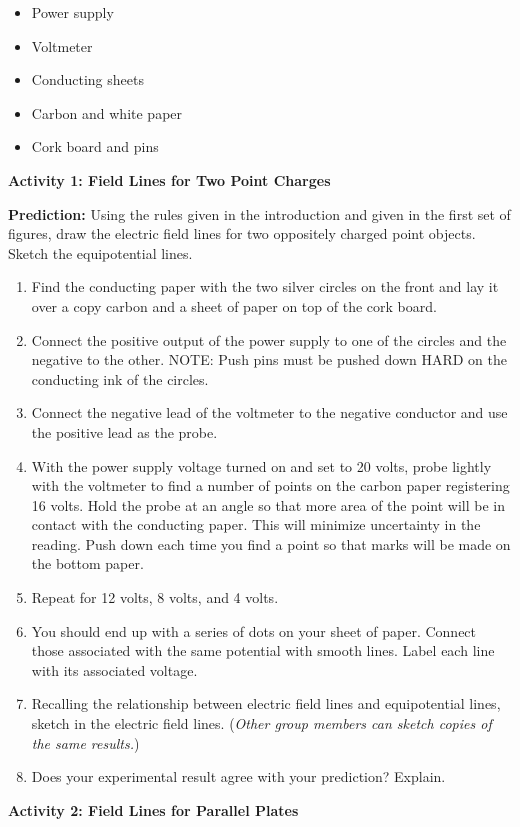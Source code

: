 \begin{itemize}
\item Power supply
\item Voltmeter
\item Conducting sheets
\item Carbon and white paper
\item Cork board and pins
\end{itemize}
\textbf{Activity 1: Field Lines for Two Point Charges}

\textbf{Prediction:} Using the rules given in the introduction and
given in the first set of figures, draw the electric field lines for two
oppositely charged point objects. Sketch the equipotential lines.
\vspace{1in}

\begin{enumerate}
\item Find the conducting paper with the two silver circles on the front
and lay it over a copy carbon and a sheet of paper on top of the cork
board.
\item Connect the positive output of the power supply to one of the circles
and the negative to the other. NOTE: Push pins must be pushed down HARD on the 
conducting ink of the circles.
\item Connect the negative lead of the voltmeter to the negative conductor
and use the positive lead as the probe. 
\item With the power supply voltage turned on and set to 20 volts, probe
lightly with the voltmeter to find a number of points on the carbon
paper registering 16 volts. Hold the probe at an angle so that more area of the 
point will be in contact with the conducting paper. This will minimize 
uncertainty in the reading. Push down each time you find a point so
that marks will be made on the bottom paper.
\item Repeat for 12 volts, 8 volts, and 4 volts.
\item You should end up with a series of dots on your sheet of paper. Connect
those associated with the same potential with smooth lines. Label each line 
with its associated voltage.
\item Recalling the relationship between electric field lines and equipotential
lines, sketch in the electric field lines. (\emph{Other group members
can sketch copies of the same results.})
\item Does your experimental result agree with your prediction? Explain.
\vspace{15mm}

\end{enumerate}
\textbf{Activity 2: Field Lines for Parallel Plates}

